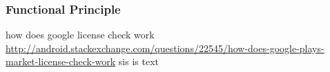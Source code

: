\subsubsection{Functional Principle} \label{subsection:license-google-functional}
how does google license check work \url{http://android.stackexchange.com/questions/22545/how-does-google-plays-market-license-check-work}\newline
sis is text
